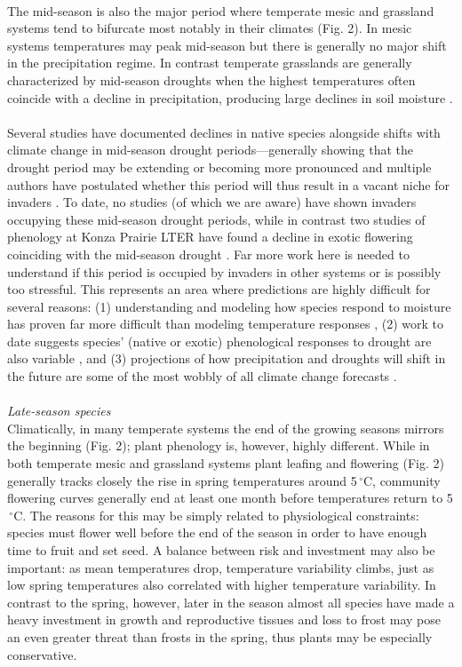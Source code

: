 \documentclass[11pt,a4paper,oneside]{article}
\begin{document}
\\
The mid-season is also the major period where temperate mesic and grassland systems tend to bifurcate most notably in their climates (Fig. 2). In mesic systems temperatures may peak mid-season but there is generally no major shift in the precipitation regime. In contrast temperate grasslands are generally characterized by mid-season droughts when the highest temperatures often coincide with a decline in precipitation, producing large declines in soil moisture \citep[e.g.,][]{Craine:2012kl}.\\
\\
Several studies have documented declines in native species alongside shifts with climate change in mid-season drought periods---generally showing that the drought period may be extending or becoming more pronounced \citep{Aldridge:2011} and multiple authors have postulated whether this period will thus result in a vacant niche for invaders \citep{Sherry:2007fq,Aldridge:2011}. To date, no studies (of which we are aware) have shown invaders occupying these mid-season drought periods, while in contrast two studies of phenology at Konza Prairie LTER have found a decline in exotic flowering coinciding with the mid-season drought \citep{Craine:2012kl,wolkovichAmBot2013}. Far more work here is needed to understand if this period is occupied by invaders in other systems or is possibly too stressful. This represents an area where predictions are highly difficult for several reasons: (1) understanding and modeling how species respond to moisture has proven far more difficult than modeling temperature responses \citep{Crimmins:2011lq,wolkovichAmBot2013}, (2) work to date suggests species' (native or exotic)  phenological responses to drought are also variable \citep{Jentsch:2009ff,Prieto:2009fu}, and (3) projections of how precipitation and droughts will shift in the future are some of the most wobbly of all climate change forecasts \citep{knutti2013}.\\
\\
\noindent \emph{Late-season species}\\
Climatically, in many temperate systems the end of the growing seasons mirrors the beginning (Fig. 2); plant phenology is, however, highly different. While in both temperate mesic and grassland systems plant leafing and flowering (Fig. 2) generally tracks closely the rise in spring temperatures around 5$\,^{\circ}\mathrm{C}$, community flowering curves generally end at least one month before temperatures return to 5$\,^{\circ}\mathrm{C}$. The reasons for this may be simply related to physiological constraints: species must flower well before the end of the season in order to have enough time to fruit and set seed. A balance between risk and investment may also be important: as mean temperatures drop, temperature variability climbs, just as low spring temperatures also correlated with higher temperature variability. In contrast to the spring, however, later in the season almost all species have made a heavy investment in growth and reproductive tissues and loss to frost may pose an even greater threat than frosts in the spring, thus plants may be especially conservative. \\
\end{document}
